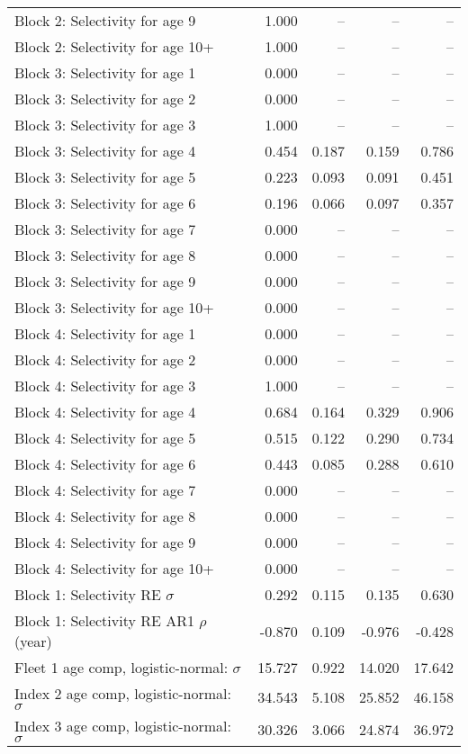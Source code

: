 \documentclass[
]{article}
\begin{document}
\begin{landscape}
\begin{longtable}[t]{lrrrr}
\addlinespace
Block 2: Selectivity for age 9 & 1.000 & -- & -- & --\\
Block 2: Selectivity for age 10+ & 1.000 & -- & -- & --\\
Block 3: Selectivity for age 1 & 0.000 & -- & -- & --\\
Block 3: Selectivity for age 2 & 0.000 & -- & -- & --\\
Block 3: Selectivity for age 3 & 1.000 & -- & -- & --\\
\addlinespace
Block 3: Selectivity for age 4 & 0.454 & 0.187 & 0.159 & 0.786\\
Block 3: Selectivity for age 5 & 0.223 & 0.093 & 0.091 & 0.451\\
Block 3: Selectivity for age 6 & 0.196 & 0.066 & 0.097 & 0.357\\
Block 3: Selectivity for age 7 & 0.000 & -- & -- & --\\
Block 3: Selectivity for age 8 & 0.000 & -- & -- & --\\
\addlinespace
Block 3: Selectivity for age 9 & 0.000 & -- & -- & --\\
Block 3: Selectivity for age 10+ & 0.000 & -- & -- & --\\
Block 4: Selectivity for age 1 & 0.000 & -- & -- & --\\
Block 4: Selectivity for age 2 & 0.000 & -- & -- & --\\
Block 4: Selectivity for age 3 & 1.000 & -- & -- & --\\
\addlinespace
Block 4: Selectivity for age 4 & 0.684 & 0.164 & 0.329 & 0.906\\
Block 4: Selectivity for age 5 & 0.515 & 0.122 & 0.290 & 0.734\\
Block 4: Selectivity for age 6 & 0.443 & 0.085 & 0.288 & 0.610\\
Block 4: Selectivity for age 7 & 0.000 & -- & -- & --\\
Block 4: Selectivity for age 8 & 0.000 & -- & -- & --\\
\addlinespace
Block 4: Selectivity for age 9 & 0.000 & -- & -- & --\\
Block 4: Selectivity for age 10+ & 0.000 & -- & -- & --\\
Block 1: Selectivity RE $\sigma$ & 0.292 & 0.115 & 0.135 & 0.630\\
Block 1: Selectivity RE AR1 $\rho$ (year) & -0.870 & 0.109 & -0.976 & -0.428\\
Fleet 1 age comp, logistic-normal: $\sigma$ & 15.727 & 0.922 & 14.020 & 17.642\\
\addlinespace
Index 2 age comp, logistic-normal: $\sigma$ & 34.543 & 5.108 & 25.852 & 46.158\\
Index 3 age comp, logistic-normal: $\sigma$ & 30.326 & 3.066 & 24.874 & 36.972\\*
\end{longtable}
\end{landscape}
\end{document}
